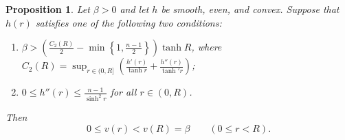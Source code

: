 \documentclass[11pt,leqno]{amsart}
\newtheorem{prop}{Proposition}[section]
\numberwithin{equation}{section}
\begin{document}
\begin{prop}\label{prop:Hyperbolic_v_max}
Let $\beta > 0$  and let \(h\) be smooth, even, and convex. Suppose that $h(r)$ satisfies one of the following two conditions: 
\begin{enumerate}
    \item[\textup{(i)}] $\beta > \left(\frac{C_{2}(R)}{2}-\min\left\{1,\frac{n-1}{2}\right\}\right)\tanh R$, where $C_{2}(R)=\sup_{r\in (0,R]}\left(\frac{h'(r)}{\tanh r}+\frac{h''(r)}{\tanh' r}\right)$;
    \item[\textup{(ii)}] $0\leq h''(r) \leq  \frac{n-1}{\sinh^{2}r}$ for all $r\in(0,R)$.
\end{enumerate}
Then
\begin{equation}\label{eq:v-Hyperbolic-bound}
	0\leq v(r)<v(R)=\beta
	\qquad(0\leq r<R).
\end{equation}
\end{prop}
\end{document}
